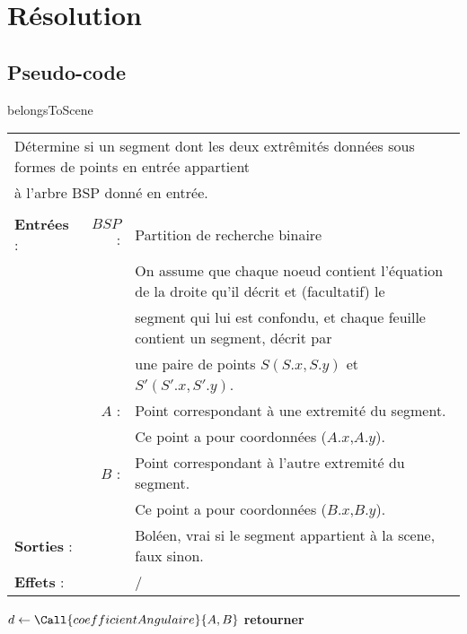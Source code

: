 \documentclass[10pt]{article}
\begin{document}
\newpage
\section{Résolution}
\subsection{Pseudo-code}
\begin{algorithm}[!h]
\caption{belongsToScene}
\begin{tabular}{lrl}
\multicolumn{3}{l}{Détermine si un segment dont les deux extrêmités données sous formes de points en entrée appartient}\\
\multicolumn{3}{l}{à l'arbre BSP donné en entrée.}\\
&&\\
\textbf{Entrées} : &$BSP$ : &Partition de recherche binaire\\
& &On assume que chaque noeud contient l'équation de la droite qu'il décrit et (facultatif) le\\ 
& &segment qui lui est confondu, et chaque feuille contient un segment, décrit par\\
& &une paire de points $S(S.x,S.y)$ et $S'(S'.x,S'.y)$.\\ 
&$A$ : &Point correspondant à une extremité du segment.\\
& &Ce point a pour coordonnées ($A.x$,$A.y$).\\
&$B$ : &Point correspondant à l'autre extremité du segment.\\
& &Ce point a pour coordonnées ($B.x$,$B.y$).\\
\textbf{Sorties} :& &Boléen, vrai si le segment appartient à la scene, faux sinon.\\
\textbf{Effets} :& &/
\end{tabular}
\begin{algorithmic}[1]
\State $d\gets\Call{coefficientAngulaire}{A,B}$
\State \textbf{retourner} 
\EndProcedure
\end{algorithmic}
\end{algorithm}
\end{document}
